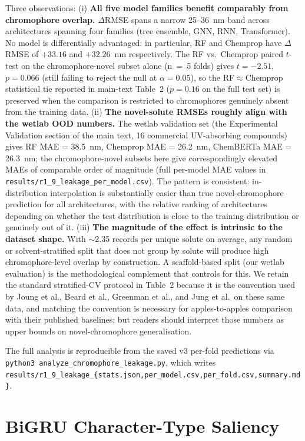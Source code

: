 \documentclass[journal=jcisd8,manuscript=suppinfo]{achemso}
\begin{document}
Three observations:
(i) \textbf{All five model families benefit comparably from chromophore overlap.} $\Delta$RMSE spans a narrow 25--36~nm band across architectures spanning four families (tree ensemble, GNN, RNN, Transformer). No model is differentially advantaged: in particular, RF and Chemprop have $\Delta$RMSE of $+33.16$ and $+32.26$~nm respectively. The RF vs.\ Chemprop paired $t$-test on the chromophore-novel subset alone (n~=~5 folds) gives $t = -2.51$, $p = 0.066$ (still failing to reject the null at $\alpha = 0.05$), so the RF$\approx$Chemprop statistical tie reported in main-text Table~2 ($p = 0.16$ on the full test set) is preserved when the comparison is restricted to chromophores genuinely absent from the training data.
(ii) \textbf{The novel-solute RMSEs roughly align with the wetlab OOD numbers.} The wetlab validation set (the Experimental Validation section of the main text, 16 commercial UV-absorbing compounds) gives RF MAE = 38.5~nm, Chemprop MAE = 26.2~nm, ChemBERTa MAE = 26.3~nm; the chromophore-novel subsets here give correspondingly elevated MAEs of comparable order of magnitude (full per-model MAE values in \texttt{results/r1\_9\_leakage\_per\_model.csv}). The pattern is consistent: in-distribution interpolation is substantially easier than true novel-chromophore prediction for all architectures, with the relative ranking of architectures depending on whether the test distribution is close to the training distribution or genuinely out of it.
(iii) \textbf{The magnitude of the effect is intrinsic to the dataset shape.} With $\sim$2.35 records per unique solute on average, any random or solvent-stratified split that does not group by solute will produce high chromophore-level overlap by construction. A scaffold-based split (our wetlab evaluation) is the methodological complement that controls for this. We retain the standard stratified-CV protocol in Table~2 because it is the convention used by Joung et al., Beard et al., Greenman et al., and Jung et al.\ on these same data, and matching the convention is necessary for apples-to-apples comparison with their published baselines; but readers should interpret those numbers as upper bounds on novel-chromophore generalisation.

The full analysis is reproducible from the saved v3 per-fold predictions via \texttt{python3 analyze\_chromophore\_leakage.py}, which writes \texttt{results/r1\_9\_leakage\_\{stats.json,per\_model.csv,per\_fold.csv,summary.md\}}.


\section{BiGRU Character-Type Saliency}
\label{sec:chartype_saliency}
\end{document}
